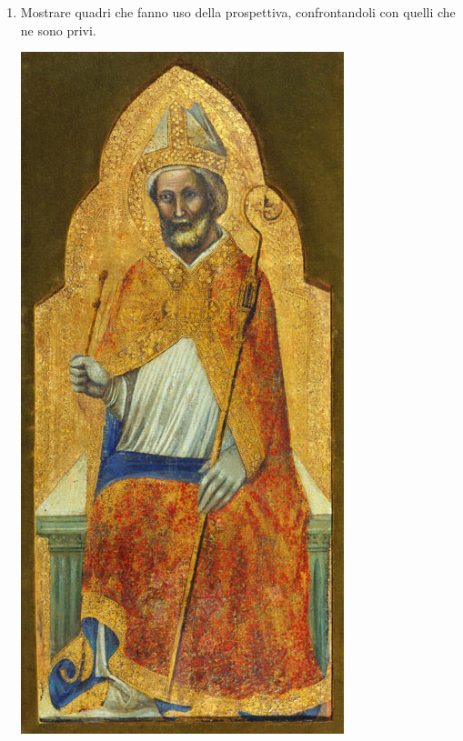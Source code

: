 \documentclass[12pt,a4paper]{article}
\begin{document}
\begin{enumerate}
	\item Mostrare quadri che fanno uso della prospettiva, confrontandoli con quelli che ne sono privi. \par
	\begin{minipage}{\linewidth}
		\centering
		\includegraphics[scale=0.35]{SanAmbrogio.jpg}
	\end{minipage} 
	

\end{enumerate}
\end{document}
